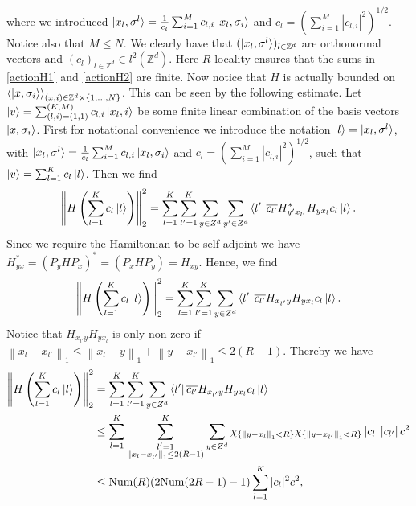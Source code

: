 \documentclass[a4paper,11pt]{article}
\newcommand{\norm}[1]{\left\lVert #1 \right\rVert}
\newcommand{\abs}[1]{\left\lvert #1 \right\rvert}
\newcommand{\Z}{\mathbb{Z}}
\numberwithin{equation}{section}
\begin{document}
 	 where we introduced $ \ket{x_l,\sigma^l}=\frac{1}{c_l}\sum_{i=1}^{M}c_{l,i}\ket{x_l,\sigma_i} $ and $ c_l=(\sum_{i=1}^{M}\abs{c_{l,i}}^2)^{1/2} $. Notice also that $ M\leq N $. We clearly have that $ (\ket{x_l,\sigma^l})_{l\in\Z^d} $ are orthonormal vectors and $ (c_l)_{l\in\Z^d}\in l^2(\Z^d) $. Here $ R $-locality ensures that the sums in \eqref{actionH1} and \eqref{actionH2} are finite. Now notice that $ H $ is actually bounded on $ \braket{\ket{x,\sigma_i}}_{(x,i)\in\Z^d\times\{1,...,N\}}  $. This can be seen by the following estimate. Let $ \ket{v}=\sum_{(l,i)=(1,1)}^{(K,M)}c_{l,i}\ket{x_l,i} $ be some finite linear combination of the basis vectors $ \ket{x,\sigma_i} $. First for notational convenience we introduce the notation $ \ket{l}=\ket{x_l,\sigma^l}$, with $\ket{x_l,\sigma^l}=\frac{1}{c_l}\sum_{i=1}^{M}c_{l,i}\ket{x_l,\sigma_i} $ and $ c_l=(\sum_{i=1}^{M}\abs{c_{l,i}}^2)^{1/2} $, such that $ \ket{v}=\sum_{l=1}^{K}c_l\ket{l} $. Then we find \begin{equation}
 	 \norm{H\left(\sum_{l=1}^{K}c_l\ket{l}\right)}_2^2=\sum_{l=1}^{K}\sum_{l'=1}^{K}\sum_{y\in Z^d}\sum_{y'\in Z^d}\bra{l'}\overline{c_{l'}}H_{y'x_{l'}}^*H_{yx_l}c_l\ket{l}.
 	 \end{equation}
 	 Since we require the Hamiltonian to be self-adjoint we have $ H_{yx}^*=(P_yHP_x)^*=(P_xHP_y)=H_{xy} $. Hence, we find \begin{equation}
 	  \norm{H\left(\sum_{l=1}^{K}c_l\ket{l}\right)}_2^2=\sum_{l=1}^{K}\sum_{l'=1}^{K}\sum_{y\in Z^d}\bra{l'}\overline{c_{l'}}H_{x_{l'}y}H_{yx_l}c_l\ket{l}.
 	 \end{equation}
 	 Notice that $ H_{x_{l'}y}H_{yx_l} $ is only non-zero if $ \norm{x_l-x_{l'}}_1\leq\norm{x_l-y}_1+\norm{y-x_{l'}}_1\leq2(R-1) $. Thereby we have
 	 \begin{equation}
 	 \begin{aligned}
 	 \norm{H\left(\sum_{l=1}^{K}c_l\ket{l}\right)}_2^2&=\sum_{l=1}^{K}\sum_{l'=1}^{K}\sum_{y\in Z^d}\bra{l'}\overline{c_{l'}}H_{x_{l'}y}H_{yx_l}c_l\ket{l}\\&\leq\sum_{l=1}^{K}\sum_{\substack{l'=1\\\norm{x_l-x_{l'}}_1\leq2(R-1)}}^{K}\sum_{y\in Z^d}\chi_{\{\norm{y-x_l}_1<R\}}\chi_{\{\norm{y-x_{l'}}_1<R\}}\abs{c_l}\abs{c_{l'}}c^2\\&\leq \text{Num}(R)(2\text{Num}(2R-1)-1)\sum_{l=1}^{K} |c_l|^2c^2,
 	 \end{aligned}\label{bound1}
 	 \end{equation}
\end{document}
